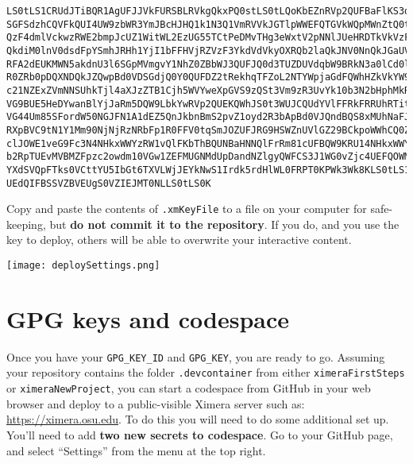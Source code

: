 \documentclass{ximera}
\begin{document}
        {\pdfOnly{\footnotesize}\begin{verbatim}
LS0tLS1CRUdJTiBQR1AgUFJJVkFURSBLRVkgQkxPQ0stLS0tLQoKbEZnRVp2QUFBaFlKS3dZQkJB
SGFSdzhCQVFkQUI4UW9zbWR3YmJBcHJHQ1k1N3Q1VmRVVkJGTlpWWEFQTGVkWQpMWnZtQ0tjQUFR
QzF4dmlVckwzRWE2bmpJcUZ1WitWL2EzUG55TCtPeDMvTHg3eWxtV2pNNlJUeHRDTkVkVzF0CmVT
QkdiM0lnV0dsdFpYSmhJRHh1YjI1bFFHVjRZVzF3YkdVdVkyOXRQb2laQkJNV0NnQkJGaUVFSVYv
RFA2dEUKMWN5akdnU3l6SGpMVmgvY1NhZ0ZBbWJ3QUFJQ0d3TUZDUVdqbW9BRkN3a0lCd0lDSWdJ
R0ZRb0pDQXNDQkJZQwpBd0VDSGdjQ0Y0QUFDZ2tRekhqTFZoL2NTYWpjaGdFQWhHZkVkYW9xRnZD
c21NZExZVmNNSUhkTjl4aXJzZTB1Cjh5WVYweXpGVS9zQSt3Vm9zR3UvYk10b3N2bHphMkRJUkQ3
VG9BUE5HeDYwanBlYjJaRm5DQW9LbkYwRVp2QUEKQWhJS0t3WUJCQUdYVlFFRkFRRUhRTitNMW52
VG44Um85SFordW50NGJFN1A1dEZ5QnJkbnBmS2pvZ1oyd2R3bApBd0VJQndBQS8xMUhNaFJuTnFL
RXpBVC9tN1Y1Mm90NjNjRzNRbFp1R0FFV0tqSmJOZUFJRG9HSWZnUVlGZ29BCkpoWWhCQ0Zmd3or
clJOWE1veG9Fc3N4NHkxWWYzRW1vQlFKbThBQUNBaHNNQlFrRm81cUFBQW9KRU14NHkxWWYKM0Vt
b2RpTUEvMVBMZFpzc2owdm10VGw1ZEFMUGNMdUpDandNZlgyQWFCS3J1WG0vZjc4UEFQOWM2eHdh
YXdSVQpFTks0VCttYU5IbGt6TXVLWjJEYkNwS1Irdk5rdHlWL0FRPT0KPWk3Wk8KLS0tLS1FTkQg
UEdQIFBSSVZBVEUgS0VZIEJMT0NLLS0tLS0K
\end{verbatim}%
        }
        Copy and paste the contents of \verb!.xmKeyFile! to a  file on your computer
        for safe-keeping, but \textbf{do not commit it to the
            repository}. If you do, and you use the key to deploy, others will be
        able to overwrite your interactive content.

        \pdfOnly{\end{multicols*}}

\begin{image}
    \texttt{[image: deploySettings.png]}
\end{image}
        \section{GPG keys and codespace}
        Once you have your \verb!GPG_KEY_ID! and \verb!GPG_KEY!, you are ready
        to go.
        Assuming your repository contains the folder \verb!.devcontainer! from
        either
        \verb!ximeraFirstSteps! or \verb!ximeraNewProject!, you can
        start a codespace from GitHub in your web browser and deploy to a
        public-visible
        Ximera server such as: \url{https://ximera.osu.edu}.
        To do this you will need to do some additional set up. You'll need to
        add
        \textbf{two
            new
            secrets to codespace}. Go to your GitHub page, and select
        ``Settings''
        from the
        menu at the top right.
\end{document}
